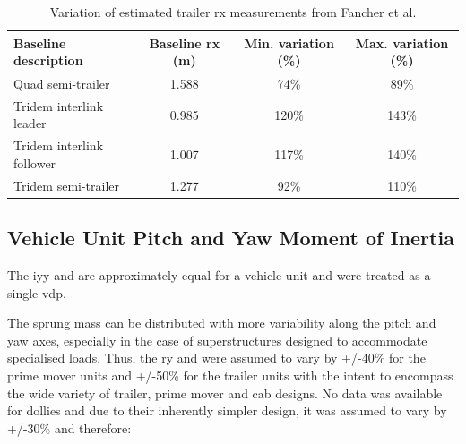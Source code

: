 \begin{table}[H]
	\centering\footnotesize
	\begin{threeparttable}

		\begin{tabulary}{\textwidth}{lccc}
			\toprule
			\textbf{Baseline description} & \textbf{Baseline \gls{rx} (m)} & \textbf{Min. variation (\%)} & \textbf{Max. variation (\%)} \\
			\midrule
			Quad semi-trailer & 1.588 & 74\%  & 89\% \\
			Tridem interlink leader & 0.985 & 120\% & 143\% \\
			Tridem interlink follower & 1.007 & 117\% & 140\% \\
			Tridem semi-trailer & 1.277 & 92\%  & 110\% \\
			\bottomrule
		\end{tabulary}

		\caption{Variation of estimated trailer \gls{rx} measurements from Fancher et al. \cite{Fancher1986}}
		\label{table:variation-of-estimated-rx-measurements-from-Fancher-et-al-trailer}


	\end{threeparttable}
\end{table}

\subsection{Vehicle Unit Pitch and Yaw Moment of Inertia}\label{section:pr-pitch-yaw-radius-of-gyration-vehicle-units}

The \gls{iyy} and  are approximately equal for a vehicle unit and were treated as a single \gls{vdp}.

The sprung mass can be distributed with more variability along the pitch and yaw axes, especially in the case of superstructures designed to accommodate specialised loads. Thus, the \gls{ry} and  were assumed to vary by +/-40\% for the prime mover units and +/-50\% for the trailer units with the intent to encompass the wide variety of trailer, prime mover and cab designs. No data was available for dollies and due to their inherently simpler design, it was assumed to vary by +/-30\% and therefore:

